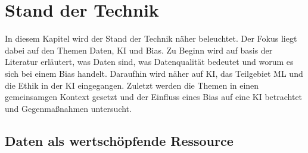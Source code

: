 \chapter{Stand der Technik}
\begin{onehalfspace}  
    \label{sec:theorie/standdertechnik}
        In diesem Kapitel wird der Stand der Technik näher beleuchtet. Der Fokus liegt dabei auf den Themen Daten, \ac{KI} und Bias. Zu Beginn wird auf basis der Literatur erläutert, was Daten sind, was Datenqualität bedeutet und worum es sich bei einem Bias handelt. Daraufhin wird näher auf \ac{KI}, das Teilgebiet \ac{ML} und die Ethik in der \ac{KI} eingegangen. Zuletzt werden die Themen in einen gemeinsamgen Kontext gesetzt und der Einfluss eines Bias auf eine \ac{KI} betrachtet und Gegenmaßnahmen untersucht. 
    
    \section{Daten als wertschöpfende Ressource}
    \label{subsec:datenchapter}

\end{onehalfspace}
